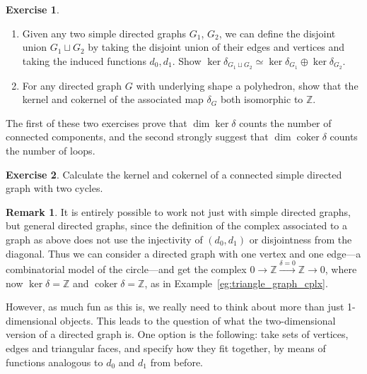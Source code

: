 \documentclass{tufte-handout}
\def\ZZ{\mathbb{Z}}
\DeclareMathOperator{\coker}{coker}
\theoremstyle{definition}
\newtheorem{ex}{Exercise}
\newtheorem*{rem}{Remark}
\begin{document}
\begin{ex}
\begin{enumerate}
\item Given any two simple directed graphs $G_1$, $G_2$, we can define the disjoint 
union $G_1 \sqcup G_2$ by taking the disjoint union of their edges and vertices and 
taking the induced functions $d_0, d_1$. Show $\ker \delta_{G_1\sqcup G_2} \simeq \ker 
\delta_{G_1} \oplus \ker \delta_{G_2}$.

\item For any directed graph $G$ with underlying shape a polyhedron, show that the 
kernel and cokernel of the associated map $\delta_G$ both isomorphic to $\ZZ$.
\end{enumerate}
\end{ex}

The first of these two exercises prove that $\dim\ker\delta$ counts the number of 
connected components, and the second strongly suggest that $\dim\coker\delta$ counts the 
number of loops.

\begin{ex}
Calculate the kernel and cokernel of a connected simple directed graph with two cycles.
\end{ex}

\begin{rem}
It is entirely possible to work not just with simple directed graphs, but general directed 
graphs, since the definition of the complex associated to a graph as above does not use the 
injectivity of $(d_0,d_1)$ or disjointness from the diagonal. Thus 
we can consider a directed
graph with one vertex and one edge---a combinatorial model of the circle---and get the complex
$0\to \ZZ \xrightarrow{\delta=0} \ZZ\to 0$, where now $\ker\delta=\ZZ$ and $\coker\delta=\ZZ$,
as in Example~\ref{eg:triangle_graph_cplx}.
\end{rem}


However, as much fun as this is, we really need to think about more than just 
1-dimensional objects. This leads to the question of what the two-dimensional version of 
a directed graph is. One option is the following: take sets of vertices, edges and 
triangular faces, and specify how they fit together, by means of functions analogous to 
$d_0$ and $d_1$ from before.
\end{document}
